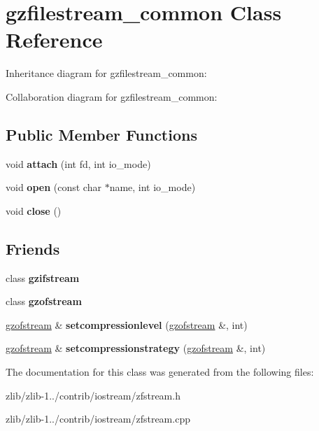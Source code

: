 \hypertarget{classgzfilestream__common}{\section{gzfilestream\+\_\+common Class Reference}
\label{classgzfilestream__common}
}


Inheritance diagram for gzfilestream\+\_\+common\+:


Collaboration diagram for gzfilestream\+\_\+common\+:
\subsection*{Public Member Functions}
\begin{DoxyCompactItemize}
\item 
\hypertarget{classgzfilestream__common_a5d89983a0a4842ac15dddc7927031d7e}{void {\bfseries attach} (int fd, int io\+\_\+mode)}\label{classgzfilestream__common_a5d89983a0a4842ac15dddc7927031d7e}

\item 
\hypertarget{classgzfilestream__common_a642732c6ddbdc437ea996acecf7d419b}{void {\bfseries open} (const char $\ast$name, int io\+\_\+mode)}\label{classgzfilestream__common_a642732c6ddbdc437ea996acecf7d419b}

\item 
\hypertarget{classgzfilestream__common_a87aa2bfaf8876e1d63edafb7515aaf5f}{void {\bfseries close} ()}\label{classgzfilestream__common_a87aa2bfaf8876e1d63edafb7515aaf5f}

\end{DoxyCompactItemize}
\subsection*{Friends}
\begin{DoxyCompactItemize}
\item 
\hypertarget{classgzfilestream__common_a8868b8b017f99a3546def94f45c13b9a}{class {\bfseries gzifstream}}\label{classgzfilestream__common_a8868b8b017f99a3546def94f45c13b9a}

\item 
\hypertarget{classgzfilestream__common_a6c603bc220f3120e5bbf9c04316ab930}{class {\bfseries gzofstream}}\label{classgzfilestream__common_a6c603bc220f3120e5bbf9c04316ab930}

\item 
\hypertarget{classgzfilestream__common_a3351bd2cbcd5eedea805dfbf996f4236}{\hyperlink{classgzofstream}{gzofstream} \& {\bfseries setcompressionlevel} (\hyperlink{classgzofstream}{gzofstream} \&, int)}\label{classgzfilestream__common_a3351bd2cbcd5eedea805dfbf996f4236}

\item 
\hypertarget{classgzfilestream__common_a37083e69bcbb72fd74685473a21eaa87}{\hyperlink{classgzofstream}{gzofstream} \& {\bfseries setcompressionstrategy} (\hyperlink{classgzofstream}{gzofstream} \&, int)}\label{classgzfilestream__common_a37083e69bcbb72fd74685473a21eaa87}

\end{DoxyCompactItemize}


The documentation for this class was generated from the following files\+:\begin{DoxyCompactItemize}
\item 
zlib/zlib-\/1../contrib/iostream/zfstream.\+h\item 
zlib/zlib-\/1../contrib/iostream/zfstream.\+cpp\end{DoxyCompactItemize}
